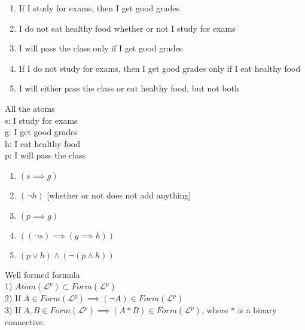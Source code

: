 \documentclass[12pt,oneside,fleqn]{article}
\theoremstyle{definition}
\newcommand{\Lp}{\mathcal{L}^p}
\begin{document}
\begin{enumerate}
\item If I study for exams, then I get good grades \\
\item I do not eat healthy food whether or not I study for exams
\item I will pass the class only if I get good grades
\item If I do not study for exams, then I get good grades only if I eat healthy food
\item I will either pass the class or eat healthy food, but not both
\end{enumerate}
All the atoms \\
s: I study for exams \\
g: I get good grades \\
h: I eat healthy food \\
p: I will pass the class
\begin{enumerate}
\item $(s \implies g)$
\item $(\neg h)$ [whether or not does not add anything]
\item $(p \implies g)$
\item $((\neg s) \implies (g \implies h))$
\item $(p \lor h) \land (\neg (p \land h))$
\end{enumerate}

Well formed formula \\
1) $Atom(\Lp) \subset Form(\Lp)$ \\
2) If $A \in Form(\Lp) \implies (\neg A) \in Form(\Lp)$ \\
3) If $A,B \in Form(\Lp) \implies (A * B) \in Form(\Lp)$, where * is a binary connective.
\end{document}
